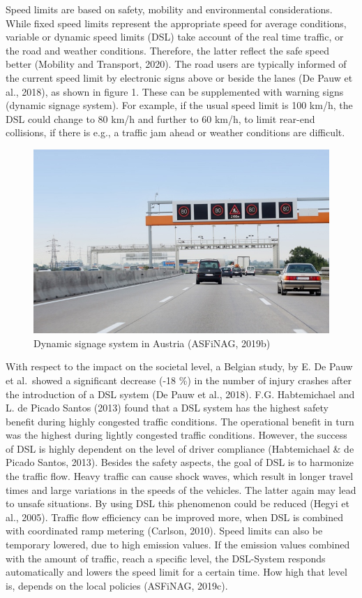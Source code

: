 \documentclass[
]{book}
\begin{document}
Speed limits are based on safety, mobility and environmental considerations. While fixed speed limits represent the appropriate speed for average conditions, variable or dynamic speed limits (DSL) take account of the real time traffic, or the road and weather conditions. Therefore, the latter reflect the safe speed better (Mobility and Transport, 2020). The road users are typically informed of the current speed limit by electronic signs above or beside the lanes (De Pauw et al., 2018), as shown in figure 1. These can be supplemented with warning signs (dynamic signage system). For example, if the usual speed limit is 100 km/h, the DSL could change to 80 km/h and further to 60 km/h, to limit rear-end collisions, if there is e.g., a traffic jam ahead or weather conditions are difficult.

\begin{figure}
\includegraphics[width=0.9\linewidth]{image/dynamic_signage} \caption{Dynamic signage system in Austria (ASFiNAG, 2019b)}\label{fig:unnamed-chunk-5}
\end{figure}

With respect to the impact on the societal level, a Belgian study, by E. De Pauw et al.~showed a significant decrease (-18 \%) in the number of injury crashes after the introduction of a DSL system (De Pauw et al., 2018). F.G. Habtemichael and L. de Picado Santos (2013) found that a DSL system has the highest safety benefit during highly congested traffic conditions. The operational benefit in turn was the highest during lightly congested traffic conditions. However, the success of DSL is highly dependent on the level of driver compliance (Habtemichael \& de Picado Santos, 2013). Besides the safety aspects, the goal of DSL is to harmonize the traffic flow. Heavy traffic can cause shock waves, which result in longer travel times and large variations in the speeds of the vehicles. The latter again may lead to unsafe situations. By using DSL this phenomenon could be reduced (Hegyi et al., 2005). Traffic flow efficiency can be improved more, when DSL is combined with coordinated ramp metering (Carlson, 2010). Speed limits can also be temporary lowered, due to high emission values. If the emission values combined with the amount of traffic, reach a specific level, the DSL-System responds automatically and lowers the speed limit for a certain time. How high that level is, depends on the local policies (ASFiNAG, 2019c).
\end{document}
